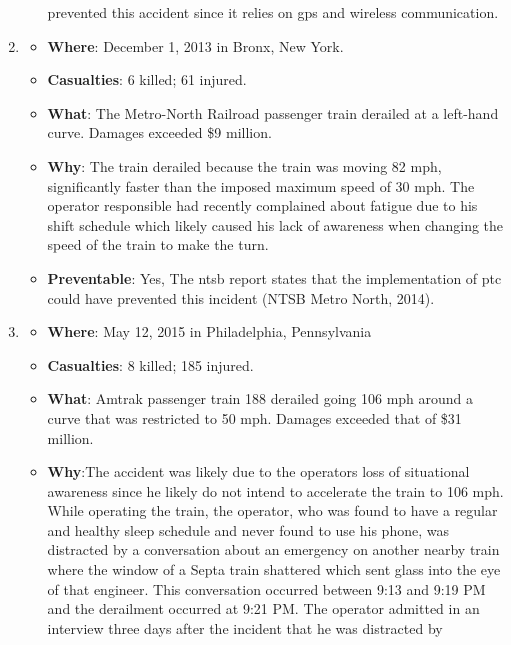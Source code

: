 \documentclass[11pt, titlepage]{article}
\begin{document}
\begin{enumerate}
\begin{itemize}
        prevented this accident since it relies on \gls{gps} and wireless
        communication.
    \end{itemize}
    \item
    \begin{itemize}
        \item \textbf{Where}: December 1, 2013 in Bronx, New York.
        \item \textbf{Casualties}: 6 killed; 61 injured.
        \item \textbf{What}: The Metro-North Railroad passenger train derailed at
        a left-hand curve. Damages exceeded \$9 million.
        \item \textbf{Why}: The train derailed because the train was moving 82
        mph, significantly faster than the imposed maximum speed of 30 mph. The
        operator responsible had recently complained about fatigue due to his
        shift schedule which likely caused his lack of awareness when changing
        the speed of the train to make the turn.
        \item \textbf{Preventable}: Yes, The \gls{ntsb} report states that the
        implementation of \gls{ptc} could have prevented this incident (NTSB Metro North,
        2014).
    \end{itemize}
    \item
    \begin{itemize}
        \item \textbf{Where}: May 12, 2015 in Philadelphia, Pennsylvania
        \item \textbf{Casualties}: 8 killed; 185 injured.
        \item \textbf{What}: Amtrak passenger train 188 derailed going 106 mph
        around a curve that was restricted to 50 mph. Damages exceeded that of
        \$31 million.
        \item \textbf{Why}:The accident was likely due to the operators loss of
        situational awareness since he likely do not intend to accelerate the
        train to 106 mph. While operating the train, the operator, who was found
        to have a regular and healthy sleep schedule and never found to use his
        phone, was distracted by a conversation about an emergency on another
        nearby train where the window of a Septa train shattered which sent glass
        into the eye of that engineer. This conversation occurred between 9:13
        and 9:19 PM and the derailment occurred at 9:21 PM. The operator admitted
        in an interview three days after the incident that he was distracted by

\end{itemize}
\end{enumerate}
\end{document}

